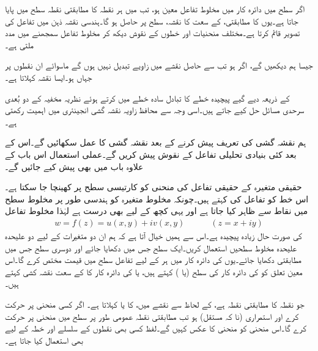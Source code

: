 اگر  سطح میں دائرہ کار  میں مخلوط تفاعل  معین ہو، تب  میں ہر نقطہ کا مطابقتی نقطہ  سطح میں پایا جاتا ہے۔یوں 
 کا مطابقتی،  کے سعت کا نقشہ،  سطح پر حاصل ہو گا۔ہندسی نقشہ ذہن میں تفاعل کی تصویر قائم کرتا ہے۔مختلف منحنیات اور خطوں کے نقوش دیکھ کر مخلوط تفاعل سمجھنے میں مدد ملتی ہے۔

جیسا ہم دیکھیں گے، اگر   ہو تب  سے حاصل نقشے میں زاویے تبدیل نہیں ہوں گے ماسوائے ان نقطوں پر جہاں  ہو۔ایسا نقشہ  کہلاتا ہے۔ 

 کے ذریعہ دیے گیے پیچیدہ خطے کا تبادل سادہ خطے میں کرتے ہوئے نظریہ مخفیہ کے  دو بُعدی سرحدی مسائل حل کیے جاتے ہیں۔اسی وجہ سے محافظ زاویہ نقشہ گشی انجینئری میں اہمیت رکھتی ہے۔

ہم نقشہ گشی کی تعریف پیش کرنے کے بعد نقشہ گشی کا عمل سکھائیں گے۔اس کے بعد کئی بنیادی تحلیلی تفاعل  کے نقوش پیش کریں گے۔عملی استعمال اس باب کے علاوہ باب  میں بھی پیش کیے جائیں گے۔

حقیقی متغیرہ  کے حقیقی تفاعل  کی منحنی  کو کارتیسی  سطح پر  کھینچا جا سکتا ہے۔اس خط کو تفاعل کی  کہتے ہیں۔چونکہ مخلوط متغیرہ  کو ہندسی طور پر مخلوط سطح میں نقاط سے ظاہر کیا جاتا ہے اور یہی کچھ   کے لیے بھی درست ہے لہٰذا مخلوط تفاعل
\begin{align}
w=f(z)=u(x,y)+iv(x,y)\quad \quad \quad (z=x+iy)
\end{align}
کی صورت حال زیادہ پیچیدہ ہے۔اس سے ہمیں خیال آتا ہے کہ ہم ان دو متغیرات کے لیے دو علیحدہ علیحدہ مخلوط سطحیں استعمال کریں۔ایک  سطح جس میں  دکھایا جائے اور دوسری  سطح جس میں مطابقتی  دکھایا جائے۔یوں   کی دائرہ کار  میں ہر   کے لیے تفاعل   سطح    میں قیمت   مختص کرے گا۔اس معین تعلق کو  کی دائرہ کار کی سطح     (یا ) کہتے ہیں، یا  کی دائرہ کار کا  کے سعت  نقشہ کشی کہتے ہیں۔

 جو نقطہ  کا مطابقتی نقطہ ہے،   کے لحاظ سے نقشے میں،  کا   یا  کہلاتا ہے۔ اگر  کسی منحنی پر حرکت کرے اور  استمراری (نا کہ مستقل)  ہو تب مطابقتی نقطہ  عمومی طور پر سطح  میں منحنی  پر حرکت کرے گا۔اس منحنی کو منحنی  کا عکس کہیں گے۔لفظ  کسی بھی نقطوں کے سلسلے اور خطہ کے لیے بھی استعمال کیا جاتا ہے۔ 

